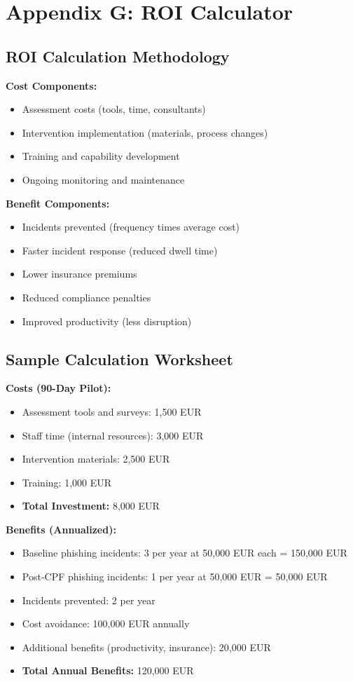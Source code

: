 \documentclass[11pt,a4paper]{article}
\begin{document}
\section{Appendix G: ROI Calculator}

\subsection{ROI Calculation Methodology}

\textbf{Cost Components:}
\begin{itemize}
\item Assessment costs (tools, time, consultants)
\item Intervention implementation (materials, process changes)
\item Training and capability development
\item Ongoing monitoring and maintenance
\end{itemize}

\textbf{Benefit Components:}
\begin{itemize}
\item Incidents prevented (frequency times average cost)
\item Faster incident response (reduced dwell time)
\item Lower insurance premiums
\item Reduced compliance penalties
\item Improved productivity (less disruption)
\end{itemize}

\subsection{Sample Calculation Worksheet}

\textbf{Costs (90-Day Pilot):}
\begin{itemize}
\item Assessment tools and surveys: 1,500 EUR
\item Staff time (internal resources): 3,000 EUR
\item Intervention materials: 2,500 EUR
\item Training: 1,000 EUR
\item \textbf{Total Investment:} 8,000 EUR
\end{itemize}

\textbf{Benefits (Annualized):}
\begin{itemize}
\item Baseline phishing incidents: 3 per year at 50,000 EUR each = 150,000 EUR
\item Post-CPF phishing incidents: 1 per year at 50,000 EUR = 50,000 EUR
\item Incidents prevented: 2 per year
\item Cost avoidance: 100,000 EUR annually
\item Additional benefits (productivity, insurance): 20,000 EUR
\item \textbf{Total Annual Benefits:} 120,000 EUR
\end{itemize}
\end{document}

